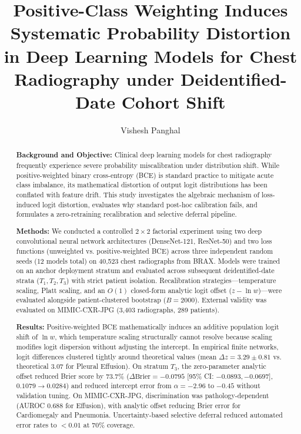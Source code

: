 \documentclass[preprint,12pt]{elsarticle}
\begin{document}
\begin{frontmatter}

\title{Positive-Class Weighting Induces Systematic Probability Distortion in Deep Learning Models for Chest Radiography under Deidentified-Date Cohort Shift}

\author{Vishesh Panghal}


\begin{abstract}
\noindent\textbf{Background and Objective:} Clinical deep learning models for chest radiography frequently experience severe probability miscalibration under distribution shift. While positive-weighted binary cross-entropy (BCE) is standard practice to mitigate acute class imbalance, its mathematical distortion of output logit distributions has been conflated with feature drift. This study investigates the algebraic mechanism of loss-induced logit distortion, evaluates why standard post-hoc calibration fails, and formulates a zero-retraining recalibration and selective deferral pipeline.

\noindent\textbf{Methods:} We conducted a controlled $2 \times 2$ factorial experiment using two deep convolutional neural network architectures (DenseNet-121, ResNet-50) and two loss functions (unweighted vs. positive-weighted BCE) across three independent random seeds (12 models total) on 40,523 chest radiographs from BRAX. Models were trained on an anchor deployment stratum and evaluated across subsequent deidentified-date strata ($T_1, T_2, T_3$) with strict patient isolation. Recalibration strategies---temperature scaling, Platt scaling, and an $O(1)$ closed-form analytic logit offset ($z - \ln w$)---were evaluated alongside patient-clustered bootstrap ($B = 2000$). External validity was evaluated on MIMIC-CXR-JPG (3,403 radiographs, 289 patients).

\noindent\textbf{Results:} Positive-weighted BCE mathematically induces an additive population logit shift of $\ln w$, which temperature scaling structurally cannot resolve because scaling modifies logit dispersion without adjusting the intercept. In empirical finite networks, logit differences clustered tightly around theoretical values (mean $\Delta z = 3.29 \pm 0.81$ vs. theoretical $3.07$ for Pleural Effusion). On stratum $T_3$, the zero-parameter analytic offset reduced Brier score by 73.7\% ($\Delta\text{Brier} = -0.0795$ [95\% CI: $-0.0893, -0.0697$], $0.1079 \to 0.0284$) and reduced intercept error from $\alpha = -2.96$ to $-0.45$ without validation tuning. On MIMIC-CXR-JPG, discrimination was pathology-dependent (AUROC $0.688$ for Effusion), with analytic offset reducing Brier error for Cardiomegaly and Pneumonia. Uncertainty-based selective deferral reduced automated error rates to $<0.01$ at $70\%$ coverage.


\end{abstract}
\end{frontmatter}
\end{document}

